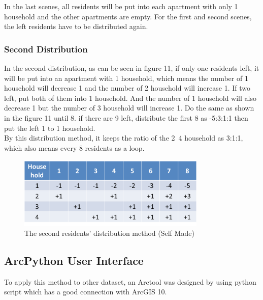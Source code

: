 In the last scenes, all residents will be put into each apartment with only 1 household and the other apartments are empty. For the first and second scenes, the left residents have to be distributed again.

\subsubsection{Second Distribution}
In the second distribution, as can be seen in figure 11, if only one residents left, it will be put into an apartment with 1 household, which means the number of 1 household will decrease 1 and the number of 2 household will increase 1. If two left, put both of them into 1 household. And the number of 1 household will also decrease 1 but the number of 3 household will increase 1. Do the same as shown in the figure 11 until 8. if there are 9 left, distribute the first 8 as -5:3:1:1 then put the left 1 to 1 household. \\
By this distribution method, it keeps the ratio of the 2~4 household as 3:1:1, which also means every 8 residents as a loop. 


\begin{figure}[H]
	\centering
	\includegraphics[width=0.8\textwidth]{phase2/group3/fig12.png}
	\caption{The second residents’ distribution method (Self Made)}
	\label{fig:figure12}
\end{figure}

\subsection{ArcPython User Interface}

To apply this method to other dataset, an Arctool was designed by using python script which has a good connection with ArcGIS 10. 

